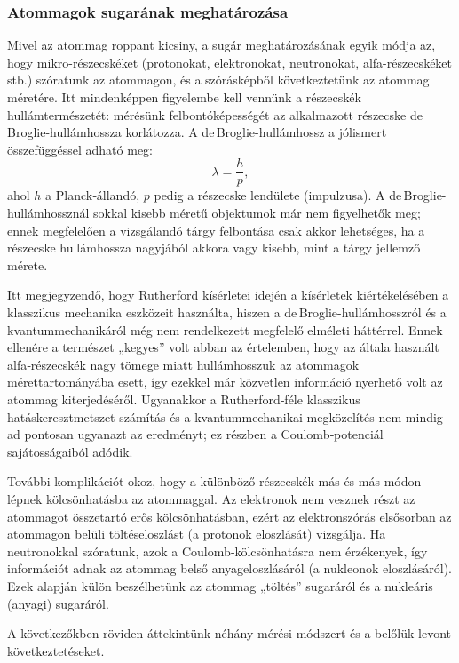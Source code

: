 \documentclass[../main.tex]{subfiles}
\begin{document}
\subsubsection*{Atommagok sugarának meghatározása}
Mivel az atommag roppant kicsiny, a sugár meghatározásának egyik módja az, hogy mikro-részecskéket (protonokat, elektronokat, neutronokat, alfa-részecskéket stb.) szóratunk az atommagon, és a szórásképből következtetünk az atommag méretére. Itt mindenképpen figyelembe kell vennünk a részecskék hullámtermészetét: mérésünk felbontóképességét az alkalmazott részecske de\,Broglie-hullámhossza korlátozza. A de\,Broglie-hullámhossz a jólismert összefüggéssel adható meg:
\[
\lambda=\frac{h}{p},
\]
ahol $h$ a Planck‑állandó, $p$ pedig a részecske lendülete (impulzusa). A de\,Broglie-hullámhossznál sokkal kisebb méretű objektumok már nem figyelhetők meg; ennek megfelelően a vizsgálandó tárgy felbontása csak akkor lehetséges, ha a részecske hullámhossza nagyjából akkora vagy kisebb, mint a tárgy jellemző mérete.

Itt megjegyzendő, hogy Rutherford kísérletei idején a kísérletek kiértékelésében a klasszikus mechanika eszközeit használta, hiszen a de\,Broglie-hullámhosszról és a kvantummechanikáról még nem rendelkezett megfelelő elméleti háttérrel. Ennek ellenére a természet „kegyes” volt abban az értelemben, hogy az általa használt alfa‑részecskék nagy tömege miatt hullámhosszuk az atommagok mérettartományába esett, így ezekkel már közvetlen információ nyerhető volt az atommag kiterjedéséről. Ugyanakkor a Rutherford‑féle klasszikus hatáskeresztmetszet‑számítás és a kvantummechanikai megközelítés nem mindig ad pontosan ugyanazt az eredményt; ez részben a Coulomb‑potenciál sajátosságaiból adódik.

További komplikációt okoz, hogy a különböző részecskék más és más módon lépnek kölcsönhatásba az atommaggal. Az elektronok nem vesznek részt az atommagot összetartó erős kölcsönhatásban, ezért az elektronszórás elsősorban az atommagon belüli töltéseloszlást (a protonok eloszlását) vizsgálja. Ha neutronokkal szóratunk, azok a Coulomb‑kölcsönhatásra nem érzékenyek, így információt adnak az atommag belső anyageloszlásáról (a nukleonok eloszlásáról). Ezek alapján külön beszélhetünk az atommag „töltés” sugaráról és a nukleáris (anyagi) sugaráról.

A következőkben röviden áttekintünk néhány mérési módszert és a belőlük levont következtetéseket.
\end{document}
